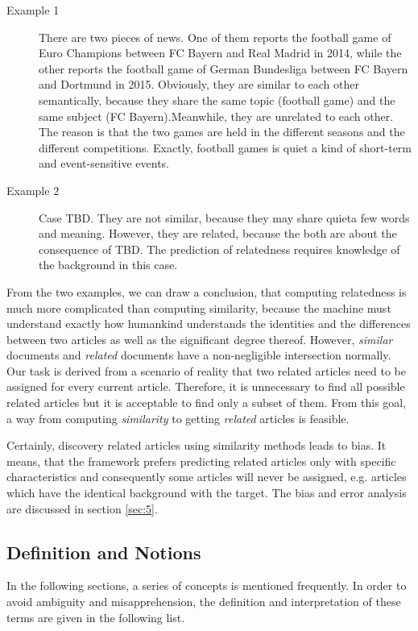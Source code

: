 \begin{description}
\item[Example 1] There are two pieces of news. One of them reports the football game of Euro Champions between FC Bayern and Real Madrid in 2014, while the other reports the football game of German Bundesliga between FC Bayern and Dortmund in 2015. Obviously, they are similar to each other semantically, because they share the same topic (football game) and the same subject (FC Bayern).Meanwhile, they are unrelated to each other. The reason is that the two games are held in the different seasons and the different competitions. Exactly, football games is quiet a kind of short-term and event-sensitive events. 
\item[Example 2] Case TBD. They are not similar, because they may share quieta few words and meaning. However, they are related, because the both are about the consequence of TBD. The prediction of relatedness requires knowledge of the background in this case.
\end{description}

From the two examples, we can draw a conclusion, that computing relatedness is much more complicated than computing similarity, because the machine must understand exactly how humankind understands the identities and the differences between two articles as well as the significant degree thereof. However, \textit{similar} documents and \textit{related} documents have a non-negligible intersection normally. Our task is derived from a scenario of reality that two related articles need to be assigned for every current article. Therefore, it is unnecessary to find all possible related articles but it is acceptable to find only a subset of them. From this goal, a way from computing \textit{similarity} to getting \textit{related} articles is feasible. 

Certainly, discovery related articles using similarity methods leads to bias. It means, that the framework prefers predicting related articles only with specific characteristics and consequently some articles will never be assigned, e.g. articles which have the identical background with the target. The bias and error analysis are discussed in section \ref{sec:5}.

\subsection{Definition and Notions}
\label{sec:4.2}

In the following sections, a series of concepts is mentioned frequently. In order to avoid ambiguity and misapprehension, the definition and interpretation of these terms are given in the following list.

